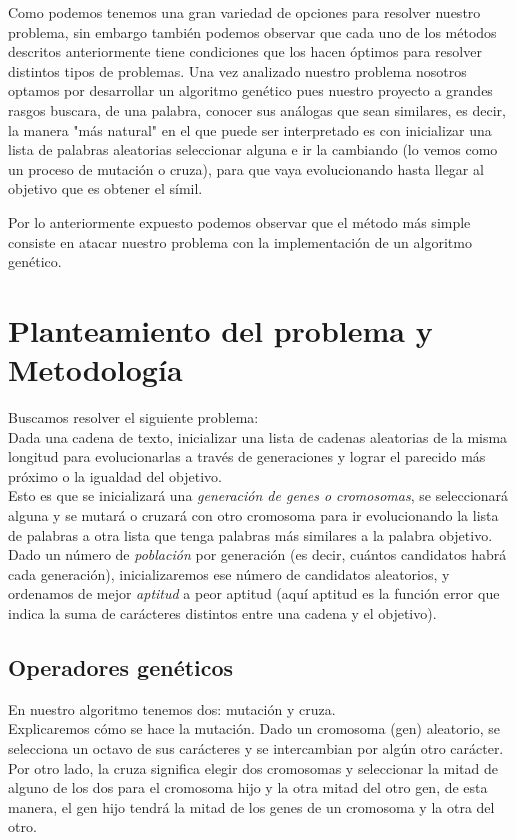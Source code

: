 \documentclass[a4paper,twocolumn,10pt]{article}
\begin{document}
Como podemos tenemos una gran variedad de opciones para resolver nuestro problema, sin embargo también podemos observar que cada uno de los métodos descritos anteriormente tiene condiciones que los hacen óptimos para resolver distintos tipos de problemas. Una vez analizado nuestro problema nosotros optamos por desarrollar un algoritmo genético pues nuestro proyecto a grandes rasgos buscara, de una palabra, conocer sus análogas que sean similares, es decir, la manera "más natural" en el que puede ser interpretado es con inicializar una lista de palabras aleatorias seleccionar alguna e ir la cambiando (lo vemos como un proceso de mutación o cruza), para que vaya evolucionando hasta llegar al objetivo que es obtener el símil. 

Por lo anteriormente expuesto podemos observar que el método más simple consiste en atacar nuestro problema con la implementación de un algoritmo genético.


\section{Planteamiento del problema y Metodología}

Buscamos resolver el siguiente problema:\\ 
Dada una cadena de texto, inicializar una lista de cadenas aleatorias de la misma longitud para evolucionarlas a través de generaciones y lograr el parecido más próximo o la igualdad del objetivo.\\
Esto es que se inicializará una \textit{generación de genes o cromosomas}, se seleccionará alguna y se mutará o cruzará con otro cromosoma para ir evolucionando la lista de palabras a otra lista que tenga palabras más similares a la palabra objetivo.\\
Dado un número de \textit{población} por generación (es decir, cuántos candidatos habrá cada generación), inicializaremos ese número de candidatos aleatorios, y ordenamos de mejor \textit{aptitud} a peor aptitud (aquí aptitud es la función error que indica la suma de carácteres distintos entre una cadena y el objetivo).\\
\subsection*{Operadores genéticos}
En nuestro algoritmo tenemos dos: mutación y cruza.\\
Explicaremos cómo se hace la mutación. Dado un cromosoma (gen) aleatorio, se selecciona un octavo de sus carácteres y se intercambian por algún otro carácter. Por otro lado, la cruza significa elegir dos cromosomas y seleccionar la mitad de alguno de los dos para el cromosoma hijo y la otra mitad del otro gen, de esta manera, el gen hijo tendrá la mitad de los genes de un cromosoma y la otra del otro.
\end{document}
